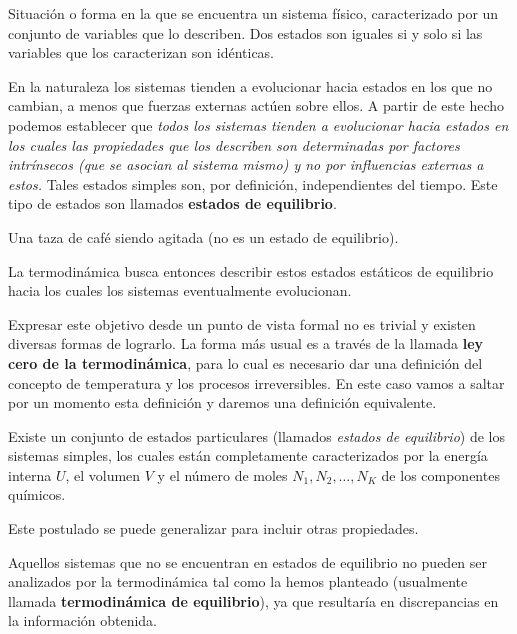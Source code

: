 \begin{definicion}
  Situación o forma en la que se encuentra un sistema físico, caracterizado por un conjunto de
  variables que lo describen. Dos estados son iguales si y solo si las variables que los
  caracterizan son idénticas.
\end{definicion}

En la naturaleza los sistemas tienden a evolucionar hacia estados en los que no cambian, a menos
que fuerzas externas actúen sobre ellos. A partir de este hecho podemos establecer que
\emph{todos los sistemas tienden a evolucionar hacia estados en los cuales las propiedades que los
describen son determinadas por factores intrínsecos (que se asocian al sistema mismo) y no por
influencias externas a estos.} Tales estados simples son, por definición, independientes del
tiempo. Este tipo de estados son llamados \textbf{estados de equilibrio}.

\begin{ejemplo}
  Una taza de café siendo agitada (no es un estado de equilibrio).
\end{ejemplo}

La termodinámica busca entonces describir estos estados estáticos de equilibrio hacia los cuales
los sistemas eventualmente evolucionan.

Expresar este objetivo desde un punto de vista formal no es trivial y existen diversas formas de
lograrlo. La forma más usual es a través de la llamada \textbf{ley cero de la termodinámica}, para
lo cual es necesario dar una definición del concepto de temperatura y los procesos irreversibles.
En este caso vamos a saltar por un momento esta definición y daremos una definición equivalente.

\begin{postulado}
  Existe un conjunto de estados particulares (llamados \emph{estados de equilibrio}) de los
  sistemas simples, los cuales están completamente caracterizados por la energía interna $U$, el
  volumen $V$ y el número de moles $N_1,N_2,\dots,N_K$ de los componentes químicos.
\end{postulado}

Este postulado se puede generalizar para incluir otras propiedades.

Aquellos sistemas que no se encuentran en estados de equilibrio no pueden ser analizados por la
termodinámica tal como la hemos planteado (usualmente llamada \textbf{termodinámica de
equilibrio}), ya que resultaría en discrepancias en la información obtenida.

